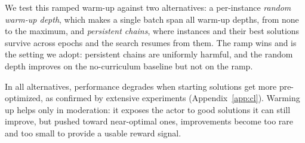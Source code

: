 \documentclass[letterpaper]{article} %
\begin{document}
We test this ramped warm-up against two alternatives: a per-instance \emph{random warm-up
depth}, which makes a single batch span all warm-up depths, from none to
the maximum, and \emph{persistent chains}, where instances and their best
solutions survive across epochs and the search resumes from them. The
ramp wins and is the setting we adopt: persistent chains are uniformly
harmful, and the random depth improves on the no-curriculum baseline but
not on the ramp. 

In all alternatives, performance degrades when starting solutions get more pre-optimized,
as confirmed by extensive experiments (Appendix~\ref{app:cl}).
Warming up helps only in moderation: it exposes the actor to good solutions it can
still improve, but pushed toward near-optimal ones, improvements become
too rare and too small to provide a usable reward signal.

\end{document}
